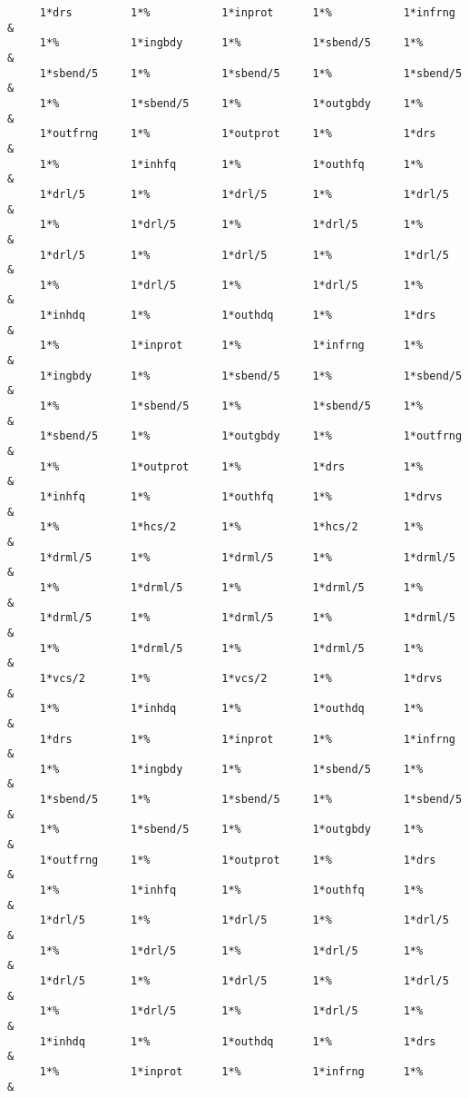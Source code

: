 \begin{footnotesize}
\begin{verbatim}
     1*drs         1*%           1*inprot      1*%           1*infrng   &
     1*%           1*ingbdy      1*%           1*sbend/5     1*%        &
     1*sbend/5     1*%           1*sbend/5     1*%           1*sbend/5  &
     1*%           1*sbend/5     1*%           1*outgbdy     1*%        &
     1*outfrng     1*%           1*outprot     1*%           1*drs      &
     1*%           1*inhfq       1*%           1*outhfq      1*%        &
     1*drl/5       1*%           1*drl/5       1*%           1*drl/5    &
     1*%           1*drl/5       1*%           1*drl/5       1*%        &
     1*drl/5       1*%           1*drl/5       1*%           1*drl/5    &
     1*%           1*drl/5       1*%           1*drl/5       1*%        &
     1*inhdq       1*%           1*outhdq      1*%           1*drs      &
     1*%           1*inprot      1*%           1*infrng      1*%        &
     1*ingbdy      1*%           1*sbend/5     1*%           1*sbend/5  &
     1*%           1*sbend/5     1*%           1*sbend/5     1*%        &
     1*sbend/5     1*%           1*outgbdy     1*%           1*outfrng  &
     1*%           1*outprot     1*%           1*drs         1*%        &
     1*inhfq       1*%           1*outhfq      1*%           1*drvs     &
     1*%           1*hcs/2       1*%           1*hcs/2       1*%        &
     1*drml/5      1*%           1*drml/5      1*%           1*drml/5   &
     1*%           1*drml/5      1*%           1*drml/5      1*%        &
     1*drml/5      1*%           1*drml/5      1*%           1*drml/5   &
     1*%           1*drml/5      1*%           1*drml/5      1*%        &
     1*vcs/2       1*%           1*vcs/2       1*%           1*drvs     &
     1*%           1*inhdq       1*%           1*outhdq      1*%        &
     1*drs         1*%           1*inprot      1*%           1*infrng   &
     1*%           1*ingbdy      1*%           1*sbend/5     1*%        &
     1*sbend/5     1*%           1*sbend/5     1*%           1*sbend/5  &
     1*%           1*sbend/5     1*%           1*outgbdy     1*%        &
     1*outfrng     1*%           1*outprot     1*%           1*drs      &
     1*%           1*inhfq       1*%           1*outhfq      1*%        &
     1*drl/5       1*%           1*drl/5       1*%           1*drl/5    &
     1*%           1*drl/5       1*%           1*drl/5       1*%        &
     1*drl/5       1*%           1*drl/5       1*%           1*drl/5    &
     1*%           1*drl/5       1*%           1*drl/5       1*%        &
     1*inhdq       1*%           1*outhdq      1*%           1*drs      &
     1*%           1*inprot      1*%           1*infrng      1*%        &

\end{verbatim}
\end{footnotesize}
